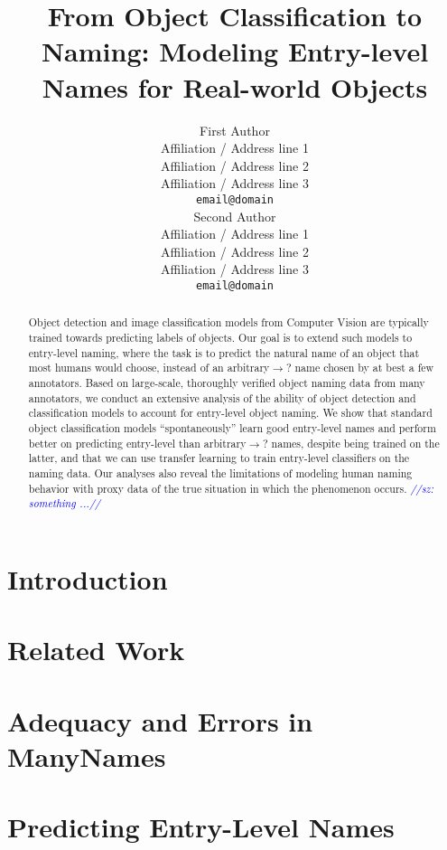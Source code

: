 \documentclass[11pt,a4paper]{article}
\title{From Object Classification to Naming: Modeling Entry-level Names for Real-world Objects}
\author{First Author \\
  Affiliation / Address line 1 \\
  Affiliation / Address line 2 \\
  Affiliation / Address line 3 \\
  \texttt{email@domain} \\\And
  Second Author \\
  Affiliation / Address line 1 \\
  Affiliation / Address line 2 \\
  Affiliation / Address line 3 \\
  \texttt{email@domain} \\}
\date{}
\newcommand{\sz}[1]{\textcolor{blue}{\emph{//sz: #1//}}}
\newcommand{\cs}[1]{\textcolor{green!60!black}{\emph{//cs: #1//}}}
\newcommand{\mn}{ManyNames\xspace}
\newcommand{\arbitrary}{arbitrary$\rightarrow$?\xspace}
\begin{document}
\maketitle
\begin{abstract}
Object detection and image classification models from Computer Vision are typically trained towards predicting labels of objects. 
Our goal is to extend such models to entry-level naming, where the task is to predict the natural name of an object that most humans would choose, instead of an \arbitrary name chosen by at best a few annotators. 
Based on large-scale, thoroughly verified object naming data from many annotators, we conduct an extensive analysis of the ability of object detection and classification models to account for entry-level object naming.
We show that standard object classification models ``spontaneously'' learn good entry-level names and perform better
on predicting entry-level than \arbitrary names, despite being trained on the latter, and that we can use transfer learning to train entry-level classifiers on the naming data. 
Our analyses also reveal the limitations of modeling human naming behavior with proxy data of the true situation in which the phenomenon occurs.  
\sz{something ...}
\end{abstract}

\section{Introduction}
\label{sec:intro}


\section{Related Work}
\label{sec:related}


\section{Adequacy and Errors in ManyNames}
\label{sec:manynames}


\section{Predicting Entry-Level Names}
\label{sec:experiments}

\end{document}
